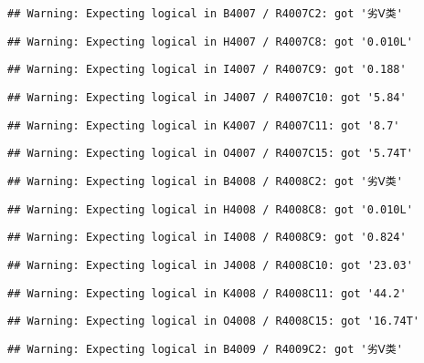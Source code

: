 \documentclass[
]{article}
\begin{document}
\begin{verbatim}
## Warning: Expecting logical in B4007 / R4007C2: got '劣Ⅴ类'
\end{verbatim}

\begin{verbatim}
## Warning: Expecting logical in H4007 / R4007C8: got '0.010L'
\end{verbatim}

\begin{verbatim}
## Warning: Expecting logical in I4007 / R4007C9: got '0.188'
\end{verbatim}

\begin{verbatim}
## Warning: Expecting logical in J4007 / R4007C10: got '5.84'
\end{verbatim}

\begin{verbatim}
## Warning: Expecting logical in K4007 / R4007C11: got '8.7'
\end{verbatim}

\begin{verbatim}
## Warning: Expecting logical in O4007 / R4007C15: got '5.74T'
\end{verbatim}

\begin{verbatim}
## Warning: Expecting logical in B4008 / R4008C2: got '劣Ⅴ类'
\end{verbatim}

\begin{verbatim}
## Warning: Expecting logical in H4008 / R4008C8: got '0.010L'
\end{verbatim}

\begin{verbatim}
## Warning: Expecting logical in I4008 / R4008C9: got '0.824'
\end{verbatim}

\begin{verbatim}
## Warning: Expecting logical in J4008 / R4008C10: got '23.03'
\end{verbatim}

\begin{verbatim}
## Warning: Expecting logical in K4008 / R4008C11: got '44.2'
\end{verbatim}

\begin{verbatim}
## Warning: Expecting logical in O4008 / R4008C15: got '16.74T'
\end{verbatim}

\begin{verbatim}
## Warning: Expecting logical in B4009 / R4009C2: got '劣Ⅴ类'
\end{verbatim}
\end{document}

